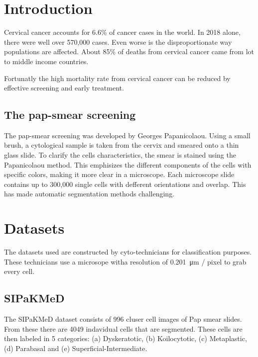 \documentclass[ms,electronic,oneside,twosidetoc,letterpaper,chaptercenter,parttop]{byumsphd}
\title{\Title}
\author{\Author}
\begin{document}
\maketitle
{}

\chapter{Introduction}

Cervical cancer accounts for 6.6\% of cancer cases in the world. In 2018 alone, there were well
over 570,000 cases. Even worse is the disproportionate way populations are affected. About 85\%
of deaths from cervical cancer came from lot to middle income countries.\cite{15}


Fortunatly the high mortality rate from cervical cancer can be reduced by effective screening and early
treatment.

\section{The pap-smear screening}

The pap-smear screening was developed by Georges Papanicolaou. Using a small brush, a cytological sample is taken from the cervix and smeared onto a thin glass slide. 
To clarify the cells characteristics, the smear is stained using the Papanicolaou method. This emphisizes the different components of the cells with specific colors, making it more clear in a microscope.\cite{herlev2}
Each microscope slide contains up to 300,000 single cells with defferent orientations and overlap\cite{herlev2}. This has made automatic segmentation methods challenging.

\chapter{Datasets}

The datasets used are constructed by cyto-technicians for classification purposes. These technicians use a microsope witha resolution of  \SI{0.201}{\micro\metre} / pixel to grab every cell.

\section{SIPaKMeD}

The SIPaKMeD dataset consists of 996 cluser cell images of Pap smear slides. From these there are
4049 indavidual cells that are segmented. These cells are then labeled in 5 categories: 
(a) Dyskeratotic, (b) Koilocytotic, (c) Metaplastic, (d) Parabasal and (e) Superficial-Intermediate.
\end{document}
